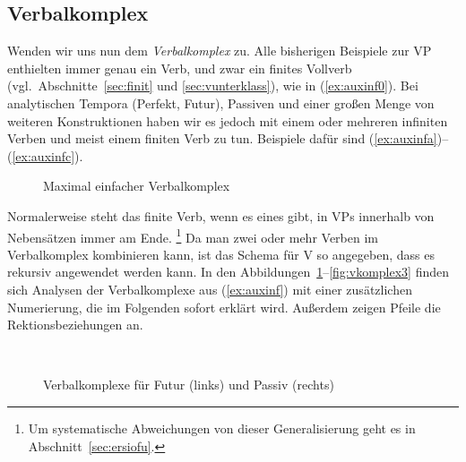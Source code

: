 \subsection{Verbalkomplex}

\label{sec:verbkomplexe}


Wenden wir uns nun dem \textit{Verbalkomplex} zu.
Alle bisherigen Beispiele zur VP enthielten immer genau ein Verb, und zwar ein finites Vollverb (vgl.\ Abschnitte~\ref{sec:finit} und \ref{sec:vunterklass}), wie in (\ref{ex:auxinf0}).
Bei analytischen Tempora (Perfekt, Futur), Passiven und einer großen Menge von weiteren Konstruktionen haben wir es jedoch mit einem oder mehreren infiniten Verben und meist einem finiten Verb zu tun.
Beispiele dafür sind (\ref{ex:auxinfa})--(\ref{ex:auxinfc}).

\begin{exe}
  \ex\label{ex:auxinf}
  \begin{xlist}
  \end{xlist}
\end{exe}

\begin{figure}
  \centering
  \caption{Maximal einfacher Verbalkomplex}
  \label{fig:vkomplex0}
\end{figure}

Normalerweise steht das finite Verb, wenn es eines gibt, in VPs innerhalb von Nebensätzen immer am Ende.%
\footnote{Um systematische Abweichungen von dieser Generalisierung geht es in Abschnitt~\ref{sec:ersiofu}.}
Da man zwei oder mehr Verben im Verbalkomplex kombinieren kann, ist das Schema für V so angegeben, dass es rekursiv angewendet werden kann.
In den Abbildungen~\ref{fig:vkomplex0}--\ref{fig:vkomplex3} finden sich Analysen der Verbalkomplexe aus (\ref{ex:auxinf}) mit einer zusätzlichen Numerierung, die im Folgenden sofort erklärt wird.
Außerdem zeigen Pfeile die Rektionsbeziehungen an.

\begin{figure}
  \centering
  ~
  \vspace{0.3cm}
  \caption{Verbalkomplexe für Futur (links) und Passiv (rechts)}
  \label{fig:vkomplex2}
\end{figure}


